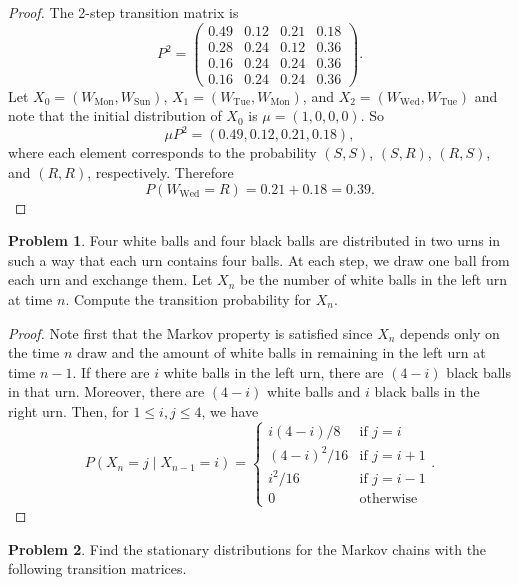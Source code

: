 \documentclass[oneside,reqno]{amsart}
\theoremstyle{definition}
\newtheorem{prob}{Problem}
\begin{document}
\begin{enumerate}
\begin{proof}
The 2-step transition matrix is 
\[
	P^2 = \begin{pmatrix}
		0.49 & 0.12 & 0.21 & 0.18 \\
		0.28 & 0.24 & 0.12 & 0.36 \\
		0.16 & 0.24 & 0.24 & 0.36 \\
		0.16 & 0.24 & 0.24 & 0.36 
	\end{pmatrix}.
\]
Let $X_0 = (W_\text{Mon}, W_\text{Sun})$, $X_1 = (W_\text{Tue}, W_\text{Mon})$, and $X_2 = (W_\text{Wed}, W_\text{Tue})$ and note that the initial distribution of $X_0$ is $\mu = (1, 0, 0, 0)$. So
\[
	\mu P^2 = (0.49, 0.12, 0.21, 0.18),
\]
where each element corresponds to the probability $(S,S)$, $(S,R)$, $(R,S)$, and $(R,R)$, respectively. Therefore 
\[
	P(W_\text{Wed} = R) = 0.21 + 0.18  = 0.39.
\]
\end{proof}
\end{enumerate}


\begin{prob}
Four white balls and four black balls are distributed in two urns in such a way that each urn contains four balls. At each step, we draw one ball from each urn and exchange them. Let $X_n$ be the number of white balls in the left urn at time $n$. Compute the transition probability for $X_n$. 
\end{prob}

\begin{proof}
Note first that the Markov property is satisfied since $X_n$ depends only on the time $n$ draw and the amount of white balls in remaining in the left urn at time $n-1$. If there are $i$ white balls in the left urn, there are $(4-i)$ black balls in that urn. Moreover, there are $(4-i)$ white balls and $i$ black balls in the right urn. Then, for $1 \leq i,j \leq 4$, we have
\[
	P(X_n = j \mid  X_{n-1} = i) = 
	\begin{cases}
		i(4-i) / 8 & \text{if } j = i \\
		(4-i)^2 / 16 & \text{if } j = i + 1 \\
		i^2 / 16 & \text{if } j = i -1 \\
		0 & \text{otherwise}
	\end{cases}.
\]
\end{proof}


\begin{prob}
Find the stationary distributions for the Markov chains with the following transition matrices.
\end{prob}
\end{document}
